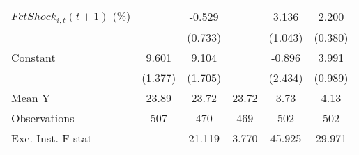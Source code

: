 {\begin{tabular}{l*{5}{c}}
\addlinespace
$ FctShock_{i,t}(t+1)$ (\%)&                     &      -0.529         &                     &       3.136\sym{***}&       2.200\sym{***}\\
                    &                     &     (0.733)         &                     &     (1.043)         &     (0.380)         \\
\addlinespace
Constant            &       9.601\sym{***}&       9.104\sym{***}&                     &      -0.896         &       3.991\sym{***}\\
                    &     (1.377)         &     (1.705)         &                     &     (2.434)         &     (0.989)         \\
\midrule
Mean Y              &       23.89         &       23.72         &       23.72         &        3.73         &        4.13         \\
Observations        &         507         &         470         &         469         &         502         &         502         \\
Exc. Inst. F-stat   &                     &      21.119         &       3.770         &      45.925         &      29.971         \\
\bottomrule
\end{tabular}
}
